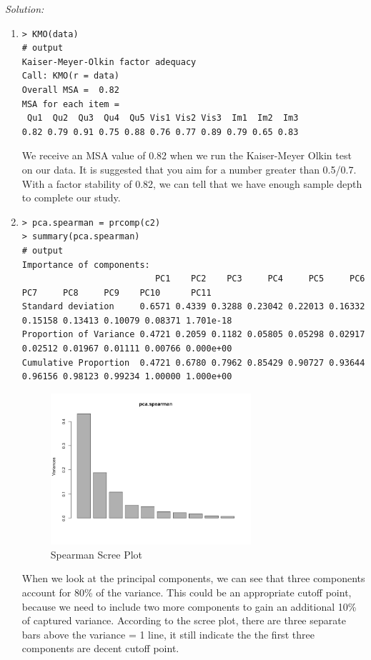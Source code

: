 \documentclass{article}
\newenvironment{solution}
    {\textit{Solution:}}
    {}
\begin{document}
\begin{solution}
\begin{enumerate}
\item\mbox{}
	\begin{lstlisting}
> KMO(data)
# output
Kaiser-Meyer-Olkin factor adequacy
Call: KMO(r = data)
Overall MSA =  0.82
MSA for each item = 
 Qu1  Qu2  Qu3  Qu4  Qu5 Vis1 Vis2 Vis3  Im1  Im2  Im3 
0.82 0.79 0.91 0.75 0.88 0.76 0.77 0.89 0.79 0.65 0.83 
	\end{lstlisting}
We receive an MSA value of 0.82 when we run the Kaiser-Meyer Olkin test on our data. It is suggested that you aim for a number greater than 0.5/0.7. With a factor stability of 0.82, we can tell that we have enough sample depth to complete our study.
\item\mbox{}
	\begin{lstlisting}
> pca.spearman = prcomp(c2)
> summary(pca.spearman)
# output
Importance of components:
                          PC1    PC2    PC3     PC4     PC5     PC6     PC7     PC8     PC9    PC10      PC11
Standard deviation     0.6571 0.4339 0.3288 0.23042 0.22013 0.16332 0.15158 0.13413 0.10079 0.08371 1.701e-18
Proportion of Variance 0.4721 0.2059 0.1182 0.05805 0.05298 0.02917 0.02512 0.01967 0.01111 0.00766 0.000e+00
Cumulative Proportion  0.4721 0.6780 0.7962 0.85429 0.90727 0.93644 0.96156 0.98123 0.99234 1.00000 1.000e+00
	\end{lstlisting}
	\begin{figure}[h]
		\centering
		\includegraphics[width=0.7\textwidth]{Figure2_ScreePlot_Spearman.jpeg}
		\caption{Spearman Scree Plot}
	\end{figure}	
When we look at the principal components, we can see that three components account for 80\% of the variance. This could be an appropriate cutoff point, because we need to include two more components to gain an additional 10\% of captured variance.
According to the scree plot, there are three separate bars above the variance = 1 line, it still indicate the the first three components are decent cutoff point.

\end{enumerate}
\end{solution}
\end{document}
